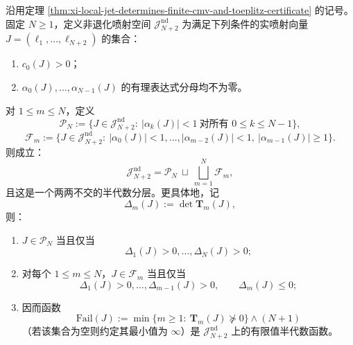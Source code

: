 \begin{theorem}\label{thm:xi-local-jet-toeplitz-failure-semialgebraic-stratification}
沿用定理 \ref{thm:xi-local-jet-determines-finite-cmv-and-toeplitz-certificate} 的记号。固定 \(N\ge 1\)，定义非退化喷射空间 \(\mathcal J_{N+2}^{\mathrm{nd}}\) 为满足下列条件的实喷射向量 \(J=(\ell_1,\dots,\ell_{N+2})\) 的集合：
\begin{enumerate}
  \item \(c_0(J)>0\)；
  \item \(\alpha_0(J),\dots,\alpha_{N-1}(J)\) 的有理表达式分母均不为零。
\end{enumerate}
对 \(1\le m\le N\)，定义
\[
\mathcal P_N
:=
\{J\in \mathcal J_{N+2}^{\mathrm{nd}}:\ |\alpha_k(J)|<1\ \text{对所有 }0\le k\le N-1\},
\]
\[
\mathcal F_m
:=
\{J\in \mathcal J_{N+2}^{\mathrm{nd}}:\ |\alpha_0(J)|<1,\dots,|\alpha_{m-2}(J)|<1,\ |\alpha_{m-1}(J)|\ge 1\}.
\]
则成立：
\[
\mathcal J_{N+2}^{\mathrm{nd}}
=
\mathcal P_N\ \sqcup\ \bigsqcup_{m=1}^{N}\mathcal F_m,
\]
且这是一个两两不交的半代数分层。更具体地，记
\[
\Delta_m(J):=\det \mathbf T_m(J),
\]
则：
\begin{enumerate}
  \item \(J\in\mathcal P_N\) 当且仅当
  \[
  \Delta_1(J)>0,\dots,\Delta_N(J)>0;
  \]
  \item 对每个 \(1\le m\le N\)，\(J\in\mathcal F_m\) 当且仅当
  \[
  \Delta_1(J)>0,\dots,\Delta_{m-1}(J)>0,
  \qquad
  \Delta_m(J)\le 0;
  \]
  \item 因而函数
  \[
  \mathrm{Fail}(J):=
  \min\{m\ge 1:\ \mathbf T_m(J)\nsucceq 0\}\wedge (N+1)
  \]
  （若该集合为空则约定其最小值为 \(\infty\)）是 \(\mathcal J_{N+2}^{\mathrm{nd}}\) 上的有限值半代数函数。
\end{enumerate}
\end{theorem}

